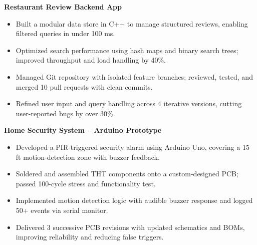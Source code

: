 \documentclass[10pt]{article}
\begin{document}
\textbf{Restaurant Review Backend App}

\begin{itemize}
  \item Built a modular data store in C++ to manage structured reviews, enabling filtered queries in under 100 ms.
  \item Optimized search performance using hash maps and binary search trees; improved throughput and load handling by 40\%.
  \item Managed Git repository with isolated feature branches; reviewed, tested, and merged 10 pull requests with clean commits.
  \item Refined user input and query handling across 4 iterative versions, cutting user-reported bugs by over 30\%.
\end{itemize}

\textbf{Home Security System – Arduino Prototype}

\begin{itemize}
  \item Developed a PIR-triggered security alarm using Arduino Uno, covering a 15 ft motion-detection zone with buzzer feedback.
  \item Soldered and assembled THT components onto a custom-designed PCB; passed 100-cycle stress and functionality test.
  \item Implemented motion detection logic with audible buzzer response and logged 50+ events via serial monitor.
  \item Delivered 3 successive PCB revisions with updated schematics and BOMs, improving reliability and reducing false triggers.
\end{itemize}
\end{document}
